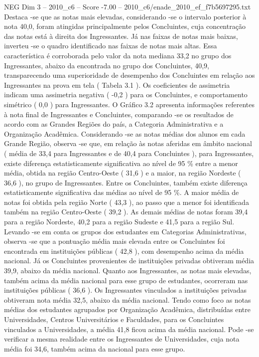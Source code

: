 \begin{textsample}{NEG Dim 3 – 2010\_c6 – Score -7.00 – 2010\_c6/enade\_2010\_ef\_f7b5697295.txt}
Destaca -se que as notas mais elevadas, considerando -se o intervalo posterior à nota 40,0, foram atingidas principalmente pelos Concluintes, cuja concentração das notas está à direita dos Ingressantes.
Já nas faixas de notas mais baixas, inverteu -se o quadro identificado nas faixas de notas mais altas.
Essa característica é corroborada pelo valor da nota mediana 33,2 no grupo dos Ingressantes, abaixo da encontrada no grupo dos Concluintes, 40,9, transparecendo uma superioridade de desempenho dos Concluintes em relação aos Ingressantes na prova em tela ( Tabela 3.1 ).
Os coeficientes de assimetria indicam uma assimetria negativa ( -0,2 ) para os Concluintes, e comportamento simétrico ( 0,0 ) para Ingressantes.
O Gráfico 3.2 apresenta informações referentes à nota final de Ingressantes e Concluintes, comparando -se os resultados de acordo com as Grandes Regiões do país, a Categoria Administrativa e a Organização Acadêmica.
Considerando -se as notas médias dos alunos em cada Grande Região, observa -se que, em relação às notas aferidas em âmbito nacional ( média de 33,4 para Ingressantes e de 40,4 para Concluintes ), para Ingressantes, existe diferença estatisticamente significativa ao nível de 95 \% entre a menor média, obtida na região Centro-Oeste ( 31,6 ) e a maior, na região Nordeste ( 36,6 ), no grupo de Ingressantes.
Entre os Concluintes, também existe diferença estatisticamente significativa das médias ao nível de 95 \%.
A maior média de notas foi obtida pela região Norte ( 43,3 ), ao passo que a menor foi identificada também na região Centro-Oeste ( 39,2 ).
As demais médias de notas foram 39,4 para a região Nordeste, 40,2 para a região Sudeste e 41,5 para a região Sul.
Levando -se em conta os grupos dos estudantes em Categorias Administrativas, observa -se que a pontuação média mais elevada entre os Concluintes foi encontrada em instituições públicas ( 42,8 ), com desempenho acima da média nacional.
Já os Concluintes provenientes de instituições privadas obtiveram média 39,9, abaixo da média nacional.
Quanto aos Ingressantes, as notas mais elevadas, também acima da média nacional para esse grupo de estudantes, ocorreram nas instituições públicas ( 36,6 ).
Os Ingressantes vinculados a instituições privadas obtiveram nota média 32,5, abaixo da média nacional.
Tendo como foco as notas médias dos estudantes agrupados por Organização Acadêmica, distribuídas entre Universidades, Centros Universitários e Faculdades, para os Concluintes vinculados a Universidades, a média 41,8 ficou acima da média nacional.
Pode -se verificar a mesma realidade entre os Ingressantes de Universidades, cuja nota média foi 34,6, também acima da nacional para esse grupo.

\end{textsample}
